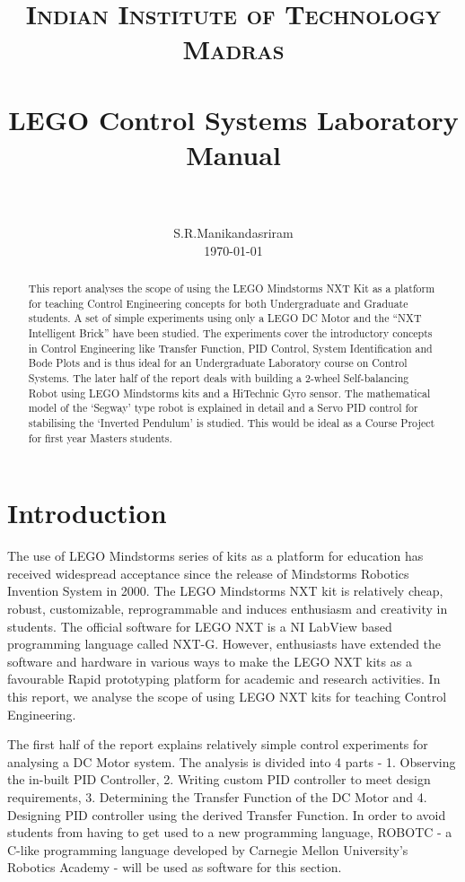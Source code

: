 \documentclass[paper=a4, fontsize=11pt]{scrartcl}
\title{
        \usefont{OT1}{bch}{b}{n}
        \normalfont \normalsize \textsc{Indian Institute of Technology Madras} \\ [25pt]
        \horrule{0.5pt} \\[0.4cm]
        \huge LEGO Control Systems Laboratory Manual \\
        \horrule{2pt} \\[0.5cm]
}
\author{
        \normalfont                                 \normalsize
        S.R.Manikandasriram\\[-3pt]      \normalsize
        \today
}
\date{}
\numberwithin{equation}{section}        %
\numberwithin{figure}{section}          %
\numberwithin{table}{section}           %
\begin{document}
\maketitle

\begin{abstract}
This report analyses the scope of using the LEGO Mindstorms NXT Kit as a platform for teaching Control Engineering concepts for both Undergraduate and Graduate students. A set of simple experiments using only a LEGO DC Motor and the ``NXT Intelligent Brick'' have been studied. The experiments cover the introductory concepts in Control Engineering like Transfer Function, PID Control, System Identification and Bode Plots and is thus ideal for an Undergraduate Laboratory course on Control Systems. The later half of the report deals with building a 2-wheel Self-balancing Robot using LEGO Mindstorms kits and a HiTechnic Gyro sensor. The mathematical model of the `Segway' type robot is explained in detail and a Servo PID control for stabilising the `Inverted Pendulum' is studied. This would be ideal as a Course Project for first year Masters students.
\end{abstract}

\section{Introduction}
The use of LEGO Mindstorms series of kits as a platform for education has received widespread acceptance since the release of Mindstorms Robotics Invention System in 2000. The LEGO Mindstorms NXT kit is relatively cheap, robust, customizable, reprogrammable and induces enthusiasm and creativity in students. The official software for LEGO NXT is a NI LabView based programming language called NXT-G. However, enthusiasts have extended the software and hardware in various ways to make the LEGO NXT kits as a favourable Rapid prototyping platform for academic and research activities. In this report, we analyse the scope of using LEGO NXT kits for teaching Control Engineering. 

The first half of the report explains relatively simple control experiments for analysing a DC Motor system. The analysis is divided into 4 parts - 1. Observing the in-built PID Controller, 2. Writing custom PID controller to meet design requirements, 3. Determining the Transfer Function of the DC Motor and 4. Designing PID controller using the derived Transfer Function. In order to avoid students from having to get used to a new programming language, ROBOTC - a C-like programming language developed by Carnegie Mellon University's Robotics Academy - will be used as software for this section. 
\end{document}
